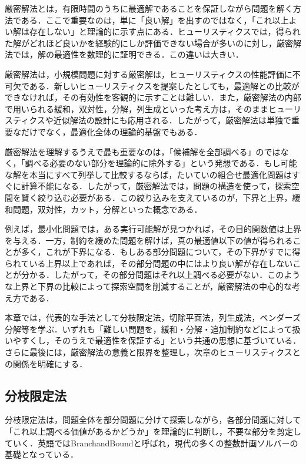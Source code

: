 厳密解法とは，有限時間のうちに最適解であることを保証しながら問題を解く方法である．ここで重要なのは，単に「良い解」を出すのではなく，「これ以上よい解は存在しない」と理論的に示す点にある．ヒューリスティクスでは，得られた解がどれほど良いかを経験的にしか評価できない場合が多いのに対し，厳密解法では，解の最適性を数理的に証明できる．この違いは大きい．

厳密解法は，小規模問題に対する厳密解は，ヒューリスティクスの性能評価に不可欠である．新しいヒューリスティクスを提案したとしても，最適解との比較ができなければ，その有効性を客観的に示すことは難しい．また，厳密解法の内部で用いられる緩和，双対性，分解，列生成といった考え方は，そのままヒューリスティクスや近似解法の設計にも応用される．したがって，厳密解法は単独で重要なだけでなく，最適化全体の理論的基盤でもある．

厳密解法を理解するうえで最も重要なのは，「候補解を全部調べる」のではなく，「調べる必要のない部分を理論的に除外する」という発想である．もし可能な解を本当にすべて列挙して比較するならば，たいていの組合せ最適化問題はすぐに計算不能になる．したがって，厳密解法では，問題の構造を使って，探索空間を賢く絞り込む必要がある．この絞り込みを支えているのが，下界と上界，緩和問題，双対性，カット，分解といった概念である．

例えば，最小化問題では，ある実行可能解が見つかれば，その目的関数値は上界を与える．一方，制約を緩めた問題を解けば，真の最適値以下の値が得られることが多く，これが下界になる．もしある部分問題について，その下界がすでに得られている上界以上であれば，その部分問題の中にはより良い解が存在しないことが分かる．したがって，その部分問題はそれ以上調べる必要がない．このような上界と下界の比較によって探索空間を削減することが，厳密解法の中心的な考え方である．

本章では，代表的な手法として分枝限定法，切除平面法，列生成法，ベンダーズ分解等を学ぶ．いずれも「難しい問題を，緩和・分解・追加制約などによって扱いやすくし，そのうえで最適性を保証する」という共通の思想に基づいている．さらに最後には，厳密解法の意義と限界を整理し，次章のヒューリスティクスとの関係を明確にする．

\subsection{分枝限定法}

分枝限定法は，問題全体を部分問題に分けて探索しながら，各部分問題に対して「これ以上調べる価値があるかどうか」を理論的に判断し，不要な部分を剪定していく\cite{bc}．英語ではBranchandBoundと呼ばれ，現代の多くの整数計画ソルバーの基礎となっている．

